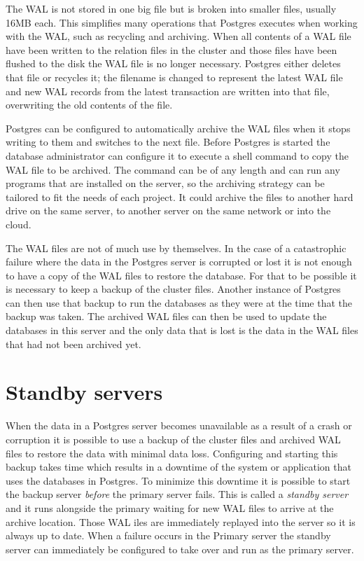 \documentclass[a4paper,12pt,twoside,BCOR=10mm]{scrbook}
\begin{document}
The WAL is not stored in one big file but is broken into smaller files, usually 16MB each. This simplifies many operations that Postgres executes when working with the WAL, such as recycling and archiving. When all contents of a WAL file have been written to the relation files in the cluster and those files have been flushed to the disk the WAL file is no longer necessary. Postgres either deletes that file or recycles it; the filename is changed to represent the latest WAL file and new WAL records from the latest transaction are written into that file, overwriting the old contents of the file.

Postgres can be configured to automatically archive the WAL files when it stops writing to them and switches to the next file. Before Postgres is started the database administrator can configure it to execute a shell command to copy the WAL file to be archived. The command can be of any length and can run any programs that are installed on the server, so the archiving strategy can be tailored to fit the needs of each project. It could archive the files to another hard drive on the same server, to another server on the same network or into the cloud.

The WAL files are not of much use by themselves. In the case of a catastrophic failure where the data in the Postgres server is corrupted or lost it is not enough to have a copy of the WAL files to restore the database. For that to be possible it is necessary to keep a backup of the cluster files. Another instance of Postgres can then use that backup to run the databases as they were at the time that the backup was taken. The archived WAL files can then be used to update the databases in this server and the only data that is lost is the data in the WAL files that had not been archived yet.


\section{Standby servers}
When the data in a Postgres server becomes unavailable as a result of a crash or corruption it is possible to use a backup of the cluster files and archived WAL files to restore the data with minimal data loss. Configuring and starting this backup takes time which results in a downtime of the system or application that uses the databases in Postgres. To minimize this downtime it is possible to start the backup server \textit{before} the primary server fails. This is called a \textit{standby server} and it runs alongside the primary waiting for new WAL files to arrive at the archive location. Those WAL iles are immediately replayed into the server so it is always up to date. When a failure occurs in the Primary server the standby server can immediately be configured to take over and run as the primary server.
\end{document}
